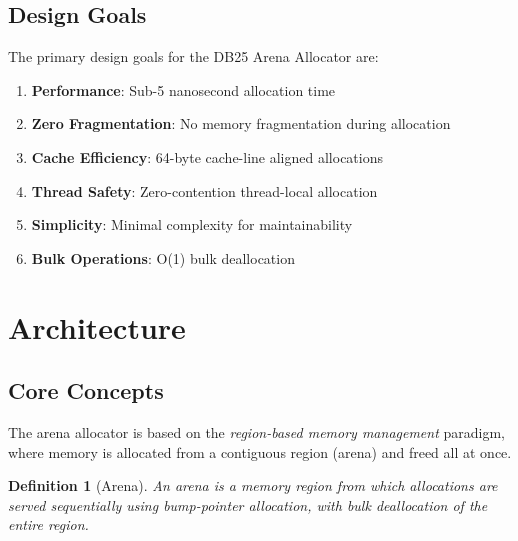 \documentclass[11pt,a4paper]{article}
\newtheorem{definition}{Definition}
\begin{document}
\subsection{Design Goals}

The primary design goals for the DB25 Arena Allocator are:

\begin{enumerate}
    \item \textbf{Performance}: Sub-5 nanosecond allocation time
    \item \textbf{Zero Fragmentation}: No memory fragmentation during allocation
    \item \textbf{Cache Efficiency}: 64-byte cache-line aligned allocations
    \item \textbf{Thread Safety}: Zero-contention thread-local allocation
    \item \textbf{Simplicity}: Minimal complexity for maintainability
    \item \textbf{Bulk Operations}: O(1) bulk deallocation
\end{enumerate}

\section{Architecture}

\subsection{Core Concepts}

The arena allocator is based on the \textit{region-based memory management} paradigm, where memory is allocated from a contiguous region (arena) and freed all at once.

\begin{definition}[Arena]
An arena is a memory region from which allocations are served sequentially using bump-pointer allocation, with bulk deallocation of the entire region.
\end{definition}
\end{document}
